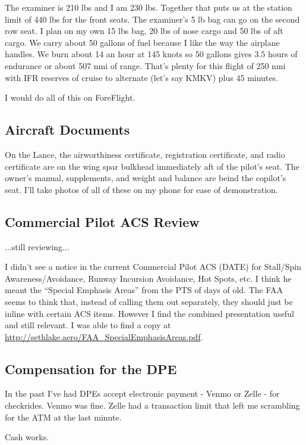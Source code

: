 The examiner is 210 lbs and I am 230 lbs. Together that puts us at the station limit of 440 lbs for the front seats. The examiner's 5 lb bag can go on the second row seat. I plan on my own 15 lbs bag, 20 lbs of nose cargo and 50 lbs of aft cargo. We carry about 50 gallons of fuel because I like the way the airplane handles. We burn about 14 an hour at 145 knots so 50 gallons gives 3.5 hours of endurance or about 507 nmi of range. That's plenty for this flight of 250 nmi with IFR reserves of cruise to alternate (let's say KMKV) plus 45 minutes.

I would do all of this on ForeFlight.

\subsection{Aircraft Documents}

On the Lance, the airworthiness certificate, registration certificate, and radio certificate are on the wing spar bulkhead immediately aft of the pilot's seat. The owner's manual, supplements, and weight and balance are beind the copilot's seat. I'll take photos of all of these on my phone for ease of demonstration.

\subsection{Commercial Pilot ACS Review}

...still reviewing...

I didn't see a notice in the current Commercial Pilot ACS (DATE) for Stall/Spin Awareness/Avoidance, Runway Incursion Avoidance, Hot Spots, etc. I think he meant the ``Special Emphasis Areas'' from the PTS of days of old. The FAA seems to think that, instead of calling them out separately, they should just be inline with certain ACS items. However I find the combined presentation useful and still relevant. I was able to find a copy at \url{http://sethlake.aero/FAA_SpecialEmphasisAreas.pdf}.

\subsection{Compensation for the DPE}

In the past I've had DPEs accept electronic payment - Venmo or Zelle - for checkrides. Venmo was fine. Zelle had a transaction limit that left me scrambling for the ATM at the last minute.

Cash works.


